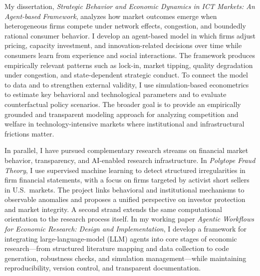 \documentclass[11pt]{article}
\begin{document}
My dissertation, \textit{Strategic Behavior and Economic Dynamics in ICT Markets: An Agent-based Framework}, analyzes how market outcomes emerge when heterogeneous firms compete under network effects, congestion, and boundedly rational consumer behavior. I develop an agent-based model in which firms adjust pricing, capacity investment, and innovation-related decisions over time while consumers learn from experience and social interactions. The framework produces empirically relevant patterns such as lock-in, market tipping, quality degradation under congestion, and state-dependent strategic conduct. To connect the model to data and to strengthen external validity, I use simulation-based econometrics to estimate key behavioral and technological parameters and to evaluate counterfactual policy scenarios. The broader goal is to provide an empirically grounded and transparent modeling approach for analyzing competition and welfare in technology-intensive markets where institutional and infrastructural frictions matter.

In parallel, I have pursued complementary research streams on financial market behavior, transparency, and AI-enabled research infrastructure. In \textit{Polytope Fraud Theory}, I use supervised machine learning to detect structured irregularities in firm financial statements, with a focus on firms targeted by activist short sellers in U.S.\ markets. The project links behavioral and institutional mechanisms to observable anomalies and proposes a unified perspective on investor protection and market integrity. 
A second strand extends the same computational orientation to the research process itself. In my working paper \textit{Agentic Workflows for Economic Research: Design and Implementation}, I develop a framework for integrating large-language-model (LLM) agents into core stages of economic research---from structured literature mapping and data collection to code generation, robustness checks, and simulation management---while maintaining reproducibility, version control, and transparent documentation. 
\end{document}
